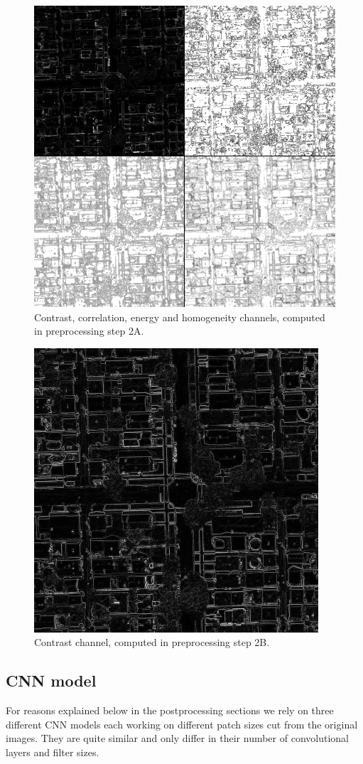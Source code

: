 \documentclass[10pt,conference,compsocconf]{IEEEtran}
\begin{document}
\begin{figure}
	\includegraphics[width=\columnwidth]{pictures/preproc1_all}
	\caption{Contrast, correlation, energy and homogeneity channels, computed in preprocessing step 2A.}
	\label{fig:preproc_glcm}
\end{figure}
\begin{figure}
	\centering
	\includegraphics[width=.5\columnwidth]{pictures/preproc2}
	\caption{Contrast channel, computed in preprocessing step 2B.}
	\label{fig:preproc_simple}
\end{figure}

\subsection{CNN model}
For reasons explained below in the postprocessing sections we rely on three different CNN models each working on different patch sizes cut from the original images. They are quite similar and only differ in their number of convolutional layers and filter sizes. 
\end{document}
